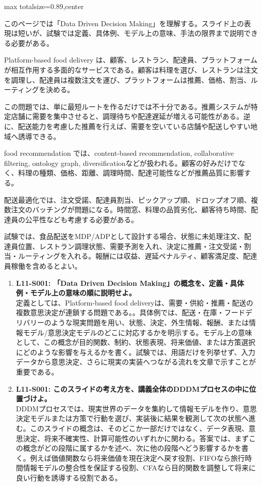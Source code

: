 \begin{minipage}[t]{0.58\textwidth}
\begin{adjustbox}{max totalsize={\textwidth}{0.89\textheight},center}
\begin{minipage}{\textwidth}\scriptsize
{}このページでは「Data Driven Decision Making」を理解する。スライド上の表現は短いが、試験では定義、具体例、モデル上の意味、手法の限界まで説明できる必要がある。\par
Platform-based food delivery は、顧客、レストラン、配達員、プラットフォームが相互作用する多面的なサービスである。顧客は料理を選び、レストランは注文を調理し、配達員は複数注文を運び、プラットフォームは推薦、価格、割当、ルーティングを決める。\par
この問題では、単に最短ルートを作るだけでは不十分である。推薦システムが特定店舗に需要を集中させると、調理待ちや配達遅延が増える可能性がある。逆に、配送能力を考慮した推薦を行えば、需要を空いている店舗や配送しやすい地域へ誘導できる。\par
food recommendation では、content-based recommendation, collaborative filtering, ontology graph, diversificationなどが扱われる。顧客の好みだけでなく、料理の種類、価格、距離、調理時間、配達可能性などが推薦品質に影響する。\par
配送最適化では、注文受諾、配達員割当、ピックアップ順、ドロップオフ順、複数注文のバッチングが問題になる。時間窓、料理の品質劣化、顧客待ち時間、配達員の公平性なども考慮する必要がある。\par
試験では、食品配送をMDP/ADPとして設計する場合、状態に未処理注文、配達員位置、レストラン調理状態、需要予測を入れ、決定に推薦・注文受諾・割当・ルーティングを入れる。報酬には収益、遅延ペナルティ、顧客満足度、配達員稼働を含めるとよい。\par{}\begin{enumerate}\item \textbf{L11-S001: 「Data Driven Decision Making」の概念を、定義・具体例・モデル上の意味の順に説明せよ。}\\定義としては、Platform-based food deliveryは、需要・供給・推薦・配送の複数意思決定が連鎖する問題である。。具体例では、配送・在庫・フードデリバリーのような現実問題を用い、状態、決定、外生情報、報酬、または情報モデル/意思決定モデルのどこに対応するかを明示する。モデル上の意味として、この概念が目的関数、制約、状態表現、将来価値、または方策選択にどのような影響を与えるかを書く。試験では、用語だけを列挙せず、入力データから意思決定、さらに現実の実装へつながる流れを文章で示すことが重要である。\item \textbf{L11-S001: このスライドの考え方を、講義全体のDDDMプロセスの中に位置づけよ。}\\DDDMプロセスでは、現実世界のデータを集約して情報モデルを作り、意思決定モデルまたは方策で行動を選び、実装後に結果を観測して次の状態へ進む。このスライドの概念は、そのどこか一部だけではなく、データ表現、意思決定、将来不確実性、計算可能性のいずれかに関わる。答案では、まずこの概念がどの段階に属するかを述べ、次に他の段階へどう影響するかを書く。例えば価値関数なら将来価値を現在決定へ戻す役割、FIFOなら旅行時間情報モデルの整合性を保証する役割、CFAなら目的関数を調整して将来に良い行動を誘導する役割である。\end{enumerate}

\end{minipage}
\end{adjustbox}
\end{minipage}
